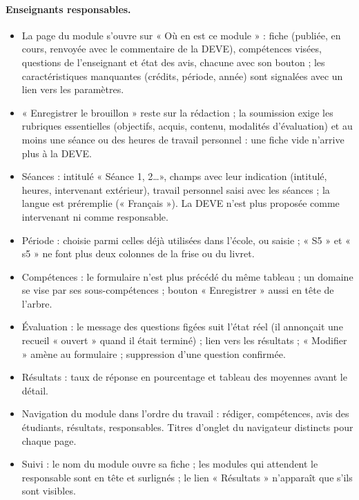 \documentclass[11pt,a4paper]{article}
\begin{document}
\paragraph{Enseignants responsables.}
\begin{itemize}
  \item La page du module s'ouvre sur « Où en est ce module » : fiche (publiée, en cours,
    renvoyée avec le commentaire de la DEVE), compétences visées, questions de l'enseignant et
    état des avis, chacune avec son bouton ; les caractéristiques manquantes (crédits,
    période, année) sont signalées avec un lien vers les paramètres.
  \item « Enregistrer le brouillon » reste sur la rédaction ; la soumission exige les rubriques
    essentielles (objectifs, acquis, contenu, modalités d'évaluation) et au moins une séance ou
    des heures de travail personnel : une fiche vide n'arrive plus à la DEVE.
  \item Séances : intitulé « Séance 1, 2\dots », champs avec leur indication (intitulé, heures,
    intervenant extérieur), travail personnel saisi avec les séances ; la langue est préremplie
    (« Français »). La DEVE n'est plus proposée comme intervenant ni comme responsable.
  \item Période : choisie parmi celles déjà utilisées dans l'école, ou saisie ; « S5 » et
    « s5 » ne font plus deux colonnes de la frise ou du livret.
  \item Compétences : le formulaire n'est plus précédé du même tableau ; un domaine se vise par
    ses sous-compétences ; bouton « Enregistrer » aussi en tête de l'arbre.
  \item Évaluation : le message des questions figées suit l'état réel (il annonçait une
    recueil « ouvert » quand il était terminé) ; lien vers les résultats ; « Modifier »
    amène au formulaire ; suppression d'une question confirmée.
  \item Résultats : taux de réponse en pourcentage et tableau des moyennes avant le détail.
  \item Navigation du module dans l'ordre du travail : rédiger, compétences, avis des étudiants,
    résultats, responsables. Titres d'onglet du navigateur distincts pour chaque page.
  \item Suivi : le nom du module ouvre sa fiche ; les modules qui attendent le responsable sont
    en tête et surlignés ; le lien « Résultats » n'apparaît que s'ils sont visibles.
\end{itemize}
\end{document}
